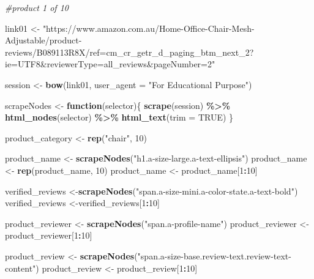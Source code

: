 \documentclass[
]{article}
\newenvironment{Shaded}{\begin{snugshade}}{\end{snugshade}}
\newcommand{\AttributeTok}[1]{\textcolor[rgb]{0.13,0.29,0.53}{#1}}
\newcommand{\CommentTok}[1]{\textcolor[rgb]{0.56,0.35,0.01}{\textit{#1}}}
\newcommand{\ConstantTok}[1]{\textcolor[rgb]{0.56,0.35,0.01}{#1}}
\newcommand{\ControlFlowTok}[1]{\textcolor[rgb]{0.13,0.29,0.53}{\textbf{#1}}}
\newcommand{\DecValTok}[1]{\textcolor[rgb]{0.00,0.00,0.81}{#1}}
\newcommand{\FunctionTok}[1]{\textcolor[rgb]{0.13,0.29,0.53}{\textbf{#1}}}
\newcommand{\NormalTok}[1]{#1}
\newcommand{\OtherTok}[1]{\textcolor[rgb]{0.56,0.35,0.01}{#1}}
\newcommand{\SpecialCharTok}[1]{\textcolor[rgb]{0.81,0.36,0.00}{\textbf{#1}}}
\newcommand{\StringTok}[1]{\textcolor[rgb]{0.31,0.60,0.02}{#1}}
\begin{document}
\begin{Shaded}
\begin{Highlighting}[]
\CommentTok{\#product 1 of 10}

\NormalTok{link01 }\OtherTok{\textless{}{-}} \StringTok{"https://www.amazon.com.au/Home{-}Office{-}Chair{-}Mesh{-}Adjustable/product{-}reviews/B089113R8X/ref=cm\_cr\_getr\_d\_paging\_btm\_next\_2?ie=UTF8\&reviewerType=all\_reviews\&pageNumber=2"}


\NormalTok{  session }\OtherTok{\textless{}{-}} \FunctionTok{bow}\NormalTok{(link01,}
               \AttributeTok{user\_agent =} \StringTok{"For Educational Purpose"}\NormalTok{)}

\NormalTok{  scrapeNodes }\OtherTok{\textless{}{-}} \ControlFlowTok{function}\NormalTok{(selector)\{}
    \FunctionTok{scrape}\NormalTok{(session) }\SpecialCharTok{\%\textgreater{}\%}
      \FunctionTok{html\_nodes}\NormalTok{(selector) }\SpecialCharTok{\%\textgreater{}\%}
      \FunctionTok{html\_text}\NormalTok{(}\AttributeTok{trim =} \ConstantTok{TRUE}\NormalTok{)}
\NormalTok{  \}}

\NormalTok{  product\_category }\OtherTok{\textless{}{-}} \FunctionTok{rep}\NormalTok{(}\StringTok{"chair"}\NormalTok{, }\DecValTok{10}\NormalTok{)}

\NormalTok{  product\_name }\OtherTok{\textless{}{-}} \FunctionTok{scrapeNodes}\NormalTok{(}\StringTok{"h1.a{-}size{-}large.a{-}text{-}ellipsis"}\NormalTok{)}
\NormalTok{  product\_name }\OtherTok{\textless{}{-}} \FunctionTok{rep}\NormalTok{(product\_name, }\DecValTok{10}\NormalTok{)}
\NormalTok{  product\_name }\OtherTok{\textless{}{-}}\NormalTok{ product\_name[}\DecValTok{1}\SpecialCharTok{:}\DecValTok{10}\NormalTok{]}
  
\NormalTok{  verified\_reviews }\OtherTok{\textless{}{-}}\FunctionTok{scrapeNodes}\NormalTok{(}\StringTok{"span.a{-}size{-}mini.a{-}color{-}state.a{-}text{-}bold"}\NormalTok{)}
\NormalTok{  verified\_reviews }\OtherTok{\textless{}{-}}\NormalTok{verified\_reviews[}\DecValTok{1}\SpecialCharTok{:}\DecValTok{10}\NormalTok{]}
  
\NormalTok{  product\_reviewer }\OtherTok{\textless{}{-}} \FunctionTok{scrapeNodes}\NormalTok{(}\StringTok{"span.a{-}profile{-}name"}\NormalTok{)}
\NormalTok{  product\_reviewer }\OtherTok{\textless{}{-}}\NormalTok{ product\_reviewer[}\DecValTok{1}\SpecialCharTok{:}\DecValTok{10}\NormalTok{]}
  
\NormalTok{  product\_review }\OtherTok{\textless{}{-}} \FunctionTok{scrapeNodes}\NormalTok{(}\StringTok{"span.a{-}size{-}base.review{-}text.review{-}text{-}content"}\NormalTok{)}
\NormalTok{  product\_review }\OtherTok{\textless{}{-}}\NormalTok{ product\_review[}\DecValTok{1}\SpecialCharTok{:}\DecValTok{10}\NormalTok{]}
  

\end{Highlighting}
\end{Shaded}
\end{document}
